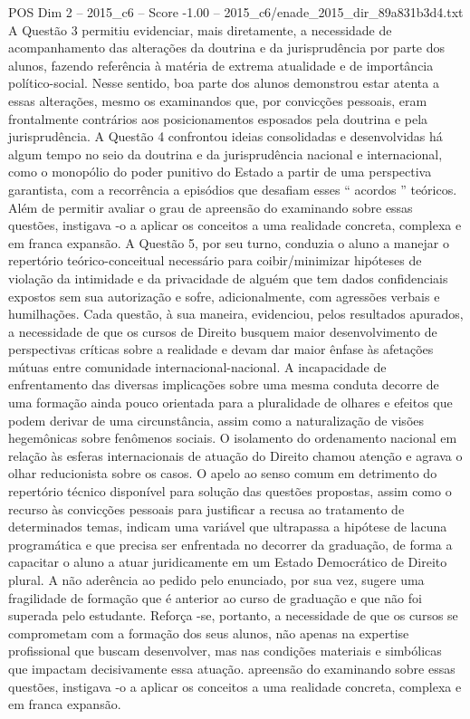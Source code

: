 \begin{textsample}{POS Dim 2 – 2015\_c6 – Score -1.00 – 2015\_c6/enade\_2015\_dir\_89a831b3d4.txt}
A Questão 3 permitiu evidenciar, mais diretamente, a necessidade de acompanhamento das alterações da doutrina e da jurisprudência por parte dos alunos, fazendo referência à matéria de extrema atualidade e de importância político-social.
Nesse sentido, boa parte dos alunos demonstrou estar atenta a essas alterações, mesmo os examinandos que, por convicções pessoais, eram frontalmente contrários aos posicionamentos esposados pela doutrina e pela jurisprudência.
A Questão 4 confrontou ideias consolidadas e desenvolvidas há algum tempo no seio da doutrina e da jurisprudência nacional e internacional, como o monopólio do poder punitivo do Estado a partir de uma perspectiva garantista, com a recorrência a episódios que desafiam esses “ acordos ” teóricos.
Além de permitir avaliar o grau de apreensão do examinando sobre essas questões, instigava -o a aplicar os conceitos a uma realidade concreta, complexa e em franca expansão.
A Questão 5, por seu turno, conduzia o aluno a manejar o repertório teórico-conceitual necessário para coibir/minimizar hipóteses de violação da intimidade e da privacidade de alguém que tem dados confidenciais expostos sem sua autorização e sofre, adicionalmente, com agressões verbais e humilhações.
Cada questão, à sua maneira, evidenciou, pelos resultados apurados, a necessidade de que os cursos de Direito busquem maior desenvolvimento de perspectivas críticas sobre a realidade e devam dar maior ênfase às afetações mútuas entre comunidade internacional-nacional.
A incapacidade de enfrentamento das diversas implicações sobre uma mesma conduta decorre de uma formação ainda pouco orientada para a pluralidade de olhares e efeitos que podem derivar de uma circunstância, assim como a naturalização de visões hegemônicas sobre fenômenos sociais.
O isolamento do ordenamento nacional em relação às esferas internacionais de atuação do Direito chamou atenção e agrava o olhar reducionista sobre os casos.
O apelo ao senso comum em detrimento do repertório técnico disponível para solução das questões propostas, assim como o recurso às convicções pessoais para justificar a recusa ao tratamento de determinados temas, indicam uma variável que ultrapassa a hipótese de lacuna programática e que precisa ser enfrentada no decorrer da graduação, de forma a capacitar o aluno a atuar juridicamente em um Estado Democrático de Direito plural.
A não aderência ao pedido pelo enunciado, por sua vez, sugere uma fragilidade de formação que é anterior ao curso de graduação e que não foi superada pelo estudante.
Reforça -se, portanto, a necessidade de que os cursos se comprometam com a formação dos seus alunos, não apenas na expertise profissional que buscam desenvolver, mas nas condições materiais e simbólicas que impactam decisivamente essa atuação. apreensão do examinando sobre essas questões, instigava -o a aplicar os conceitos a uma realidade concreta, complexa e em franca expansão.

\end{textsample}
